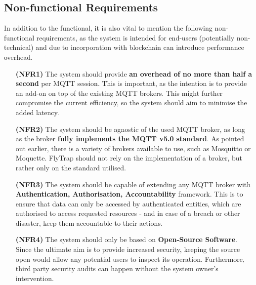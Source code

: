 \subsection{Non-functional Requirements}

In addition to the functional, it is also vital to mention the following non-functional requirements, as the system is intended for end-users (potentially non-technical) and due to incorporation with blockchain can introduce performance overhead.

\begin{itemize}[leftmargin=4.5em]
\item[\textbf{(NFR1)}] The system should provide \textbf{an overhead of no more than half a second} per MQTT session. This is important, as the intention is to provide an add-on on top of the existing MQTT brokers. This might further compromise the current efficiency, so the system should aim to minimise the added latency. 
\item[\textbf{(NFR2)}] The system should be agnostic of the used MQTT broker, as long as the broker \textbf{fully implements the MQTT v5.0 standard}. As pointed out earlier, there is a variety of brokers available to use, such as Mosquitto or Moquette. FlyTrap should not rely on the implementation of a broker, but rather only on the standard utilised.
\item[\textbf{(NFR3)}] The system should be capable of extending any MQTT broker with \textbf{Authentication, Authorisation, Accountability} framework. This is to ensure that data can only be accessed by authenticated entities, which are authorised to access requested resources - and in case of a breach or other disaster, keep them accountable to their actions.
\item[\textbf{(NFR4)}] The system should only be based on \textbf{Open-Source Software}. Since the ultimate aim is to provide increased security, keeping the source open would allow any potential users to inspect its operation. Furthermore, third party security audits can happen without the system owner's intervention.
\end{itemize}


